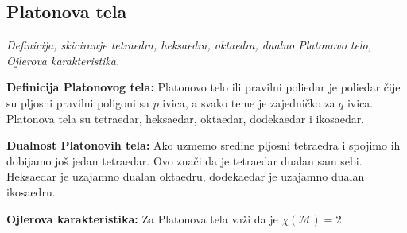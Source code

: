\documentclass[12pt]{article}
\begin{document}
\subsection{Platonova tela}
\textit{Definicija, skiciranje tetraedra, heksaedra, oktaedra, dualno Platonovo
    telo, Ojlerova karakteristika.}

\textbf{Definicija Platonovog tela:} Platonovo telo ili pravilni poliedar je
poliedar čije su pljosni pravilni poligoni sa $p$ ivica, a svako teme je
zajedničko za $q$ ivica. Platonova tela su tetraedar, heksaedar, oktaedar,
dodekaedar i ikosaedar.
\par

\textbf{Dualnost Platonovih tela:} Ako uzmemo sredine pljosni tetraedra i
spojimo ih dobijamo još jedan tetraedar. Ovo znači da je tetraedar dualan sam
sebi. Heksaedar je uzajamno dualan oktaedru, dodekaedar je uzajamno dualan
ikosaedru.
\par

\textbf{Ojlerova karakteristika:} Za Platonova tela važi da je
$\chi(\mathcal{M})=2$.

\newpage
\label{literatura}
\nocite{*}
\raggedright


\end{document}
